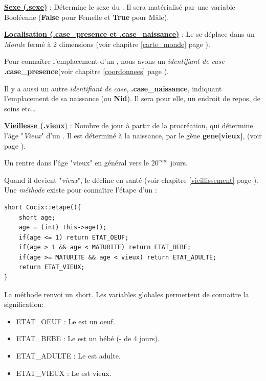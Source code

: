 \documentclass[french]{report}
\newlength{\du}\fi
\begin{document}
\begin{description}
\item[]\textbf{\underline{Sexe (.sexe)} }: Détermine le sexe du \CoCiX. Il sera matérialisé par une variable Booléenne (\textbf{False} pour Femelle et \textbf{True} pour Mâle).\\ 

\item \textbf{\underline{Localisation (.case\_presence et .case\_naissance)}} :  Le \CoCiX se déplace dans un \textit{Monde} fermé à 2 dimensions (voir chapitre \ref{carte_monde} page \pageref{carte_monde}).

Pour connaître l'emplacement d'un \CoCiX, nous avons un \textit{identifiant de case} \textbf{.case\_presence}(voir chapitre \ref{coordonnees} page \pageref{coordonnees}).

Il y a aussi un autre \textit{identifiant de case}, \textbf{.case\_naissance}, indiquant l'emplacement de sa naissance (ou \textbf{Nid}). Il sera pour elle, un endroit de repos, de soins etc\dots \label{nid}\\

\item \underline{\textbf{Vieillesse (.vieux})} : Nombre de jour à partir de la procréation, qui détermine l'âge  "\textit{Vieux}" d'un \CoCiX. \label{vieillesse}
Il est déterminé à la naissance, par le gène \textbf{gene[vieux]}, (voir page \pageref{liste_gene}).

Un \CoCiX rentre dans l'âge "vieux" en général vers le $20^{eme}$ jours.

Quand il devient "\emph{vieux}", le \CoCiX décline en santé (voir chapitre \ref{vieillissement} page \pageref{vieillissement}).\\
Une \emph{méthode} existe pour connaître l'étape d'un \CoCiX : \\

\begin{lstlisting}
short Cocix::etape(){
	short age;
	age = (int) this->age();
	if(age <= 1) return ETAT_OEUF;
	if(age > 1 && age < MATURITE) return ETAT_BEBE;
	if(age >= MATURITE && age < vieux) return ETAT_ADULTE;
	return ETAT_VIEUX;
}
\end{lstlisting}	
\end{description}
La méthode renvoi un short. Les variables globales permettent de connaitre la signification:
\begin{itemize}
	\item ETAT\_OEUF : Le \CoCiX est un oeuf.
	\item ETAT\_BEBE : Le \CoCiX est un bébé (- de 4 jours).
	\item ETAT\_ADULTE : Le \CoCiX est adulte.
	\item ETAT\_VIEUX : Le \CoCiX est vieux. 
\end{itemize} 
\end{document}
